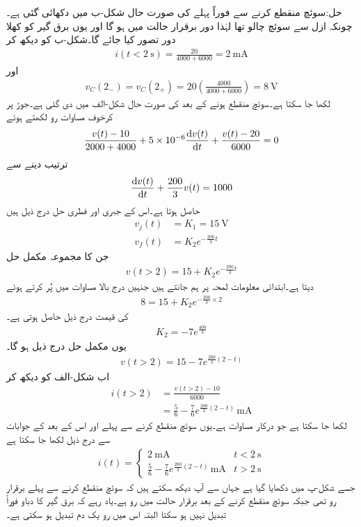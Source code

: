 حل:سوئچ منقطع کرنے سے فوراً پہلے کی صورت حال شکل-ب میں دکھائی گئی ہے۔چونکہ ازل سے سوئچ چالو تھا لہٰذا دور برقرار حالت میں ہو گا اور یوں برق گیر کو کھلا دور تصور کیا جائے گا۔شکل-ب کو دیکھ کر
\begin{align*}
i(t<\SI{2}{\second})=\frac{20}{4000+6000}=\SI{2}{\milli\ampere}
\end{align*}
اور
\begin{align*}
v_C(2_-)=v_C(2_+)=20\left(\frac{4000}{4000+6000}\right)=\SI{8}{\volt}
\end{align*}
لکھا جا سکتا ہے۔سوئچ منقطع ہونے کے بعد کی صورت حال شکل-الف میں دی گئی ہے۔جوڑ  پر کرخوف مساوات رو لکھتے ہوئے
\begin{align*}
\frac{v(t)-10}{2000+4000}+5\times 10^{-6}\frac{\dif v(t)}{\dif t}+\frac{v(t)-20}{6000}=0
\end{align*}
ترتیب دینے سے
\begin{align*}
\frac{\dif v(t)}{\dif t}+\frac{200}{3} v(t)=1000
\end{align*}
حاصل ہوتا ہے۔اس کے جبری اور فطری  حل درج ذیل ہیں
\begin{align*}
v_j(t)&=K_1=\SI{15}{\volt}\\
v_f(t)&=K_2e^{-\frac{200}{3}t}
\end{align*}
جن کا مجموعہ مکمل حل
\begin{align*}
v(t>2)=15+K_2e^{-\frac{200}{3}t}
\end{align*}
 دیتا ہے۔ابتدائی معلومات  لمحہ  پر ہم جانتے ہیں جنہیں درج بالا مساوات میں پُر کرتے ہوئے
\begin{align*}
8=15+K_2e^{-\frac{200}{3}\times 2}
\end{align*}
 کی قیمت درج ذیل حاصل ہوتی ہے۔
\begin{align*}
K_2=-7e^{\frac{400}{3}}
\end{align*}
یوں مکمل حل درج ذیل ہو گا۔
\begin{align*}
v(t>2)=15-7e^{\frac{200}{3}(2-t)}
\end{align*}
اب شکل-الف کو دیکھ کر
\begin{align*}
i(t>2)&=\frac{v(t>2)-10}{6000}\\
&=\frac{5}{6}-\frac{7}{6} e^{\frac{200}{3}(2-t)} \, \si{\milli\ampere}
\end{align*}
لکھا جا سکتا ہے جو درکار مساوات ہے۔یوں سوئچ منقطع کرنے سے پہلے اور اس کے بعد کے جوابات سے درج ذیل لکھا جا سکتا ہے
\begin{align*}
i(t)=
\begin{cases}
\SI{2}{\milli\ampere} & t<\SI{2}{\second}\\
\frac{5}{6}-\frac{7}{6} e^{\frac{200}{3}(2-t)} \, \si{\milli\ampere} & t>\SI{2}{\second}
\end{cases}
\end{align*}
جسے شکل-پ میں دکھایا گیا ہے جہاں سے آپ دیکھ سکتے ہیں کہ سوئچ منقطع کرنے سے پہلے برقرار رو  تھی جبکہ سوئچ منقطع کرنے کے بعد برقرار حالت  میں رو  ہے۔یاد رہے کہ برق گیر کا دباو فوراً تبدیل نہیں ہو سکتا البتہ اس میں رو یک دم تبدیل ہو سکتی ہے۔

